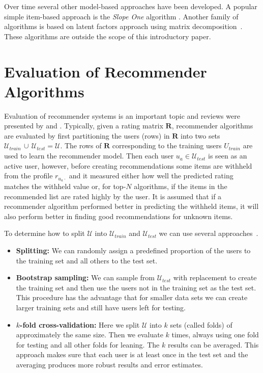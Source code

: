 \documentclass[nojss]{jss}
\newcommand{\set}[1]{\mathcal{#1}}
\newcommand{\mat}[1]{{\mathbf{#1}}}
\begin{document}
Over time several other model-based approaches have been developed.
A popular simple item-based approach is the \emph{Slope One} 
algorithm \citep{recommender:Lemire:2005}.
Another family of algorithms is based on latent factors approach using
matrix decomposition~\citep{recommender:Koren:2009}.
These algorithms are outside the scope of this introductory paper.

\section{Evaluation of Recommender Algorithms}
\label{sec:evaluation}

Evaluation of recommender systems is an important topic and 
reviews were presented 
by \cite{recommender:Herlocker:2004}
and \cite{recommender:Gunawardana:2009}.
Typically, 
given a rating matrix $\mat{R}$,
recommender algorithms are evaluated by first
partitioning the users (rows) in $\mat{R}$ into two 
sets $\set{U}_\mathit{train}\, \cup\, \set{U}_\mathit{test} = \set{U}$.
The rows of $\mat{R}$ corresponding to the training users $U_\mathit{train}$ 
are used to learn the recommender model.
Then each user $u_a \in \set{U}_\mathit{test}$ is seen as an active user,
however,
before creating recommendations some items are withheld from the
profile $r_{u_a\cdot}$ and it measured 
either how well the predicted rating matches the withheld value
or, for top-$N$ algorithms, if the items in the recommended
list are rated highly by the user.
It is assumed that if
a recommender algorithm performed better in predicting the withheld items,
it will also perform better in finding good recommendations for unknown items.

To determine how to split $\set{U}$ into 
$\set{U}_\mathit{train}$ and $\set{U}_\mathit{test}$ we can use 
several approaches~\citep{recommender:Kohavi:1995}. 
\begin{itemize}
\item {\bf Splitting:} 
We can randomly assign a predefined proportion of the users 
to the training set and all others to the test set.
\item {\bf Bootstrap sampling:}
We can sample from $\set{U}_\mathit{test}$ with replacement
to create the training set and then use the users not in the training set as
the test set. This procedure has the advantage that for smaller data sets
we can create larger training sets and still have users left for testing.
\item {\bf $k$-fold cross-validation:} Here we split $\set{U}$ into $k$ sets
(called folds) of approximately the same size. Then we evaluate $k$ times,
always using one fold for testing and all other folds for leaning. The $k$
results can be averaged. This approach makes sure that each user is at least
once in the test set and the averaging produces more robust results and error
estimates.
\end{itemize}
\end{document}
